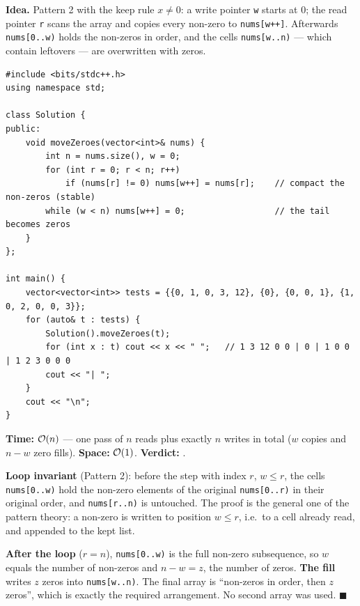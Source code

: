 \begin{algorithmbox}
\textbf{Idea.} Pattern 2 with the keep rule $x \ne 0$: a write pointer \texttt{w} starts at 0; the read pointer \texttt{r} scans the array and copies every non-zero to \texttt{nums[w++]}. Afterwards \texttt{nums[0..w)} holds the non-zeros in order, and the cells \texttt{nums[w..n)} --- which contain leftovers --- are overwritten with zeros.
\begin{lstlisting}[style=cpp]
#include <bits/stdc++.h>
using namespace std;

class Solution {
public:
    void moveZeroes(vector<int>& nums) {
        int n = nums.size(), w = 0;
        for (int r = 0; r < n; r++)
            if (nums[r] != 0) nums[w++] = nums[r];    // compact the non-zeros (stable)
        while (w < n) nums[w++] = 0;                  // the tail becomes zeros
    }
};

int main() {
    vector<vector<int>> tests = {{0, 1, 0, 3, 12}, {0}, {0, 0, 1}, {1, 0, 2, 0, 0, 3}};
    for (auto& t : tests) {
        Solution().moveZeroes(t);
        for (int x : t) cout << x << " ";   // 1 3 12 0 0 | 0 | 1 0 0 | 1 2 3 0 0 0
        cout << "| ";
    }
    cout << "\n";
}
\end{lstlisting}
\begin{complexitybox}
\textbf{Time:} $\mathcal{O}(n)$ --- one pass of $n$ reads plus exactly $n$ writes in total ($w$ copies and $n - w$ zero fills). \textbf{Space:} $\mathcal{O}(1)$. \textbf{Verdict:} \ac{}.
\end{complexitybox}
\end{algorithmbox}

\begin{invariantbox}
\textbf{Loop invariant} (Pattern 2): before the step with index $r$, $w \le r$, the cells \texttt{nums[0..w)} hold the non-zero elements of the original \texttt{nums[0..r)} in their original order, and \texttt{nums[r..n)} is untouched. The proof is the general one of the pattern theory: a non-zero is written to position $w \le r$, i.e.\ to a cell already read, and appended to the kept list.

\textbf{After the loop} ($r = n$), \texttt{nums[0..w)} is the full non-zero subsequence, so $w$ equals the number of non-zeros and $n - w = z$, the number of zeros. \textbf{The fill} writes $z$ zeros into \texttt{nums[w..n)}. The final array is ``non-zeros in order, then $z$ zeros'', which is exactly the required arrangement. No second array was used. \hfill$\blacksquare$
\end{invariantbox}

